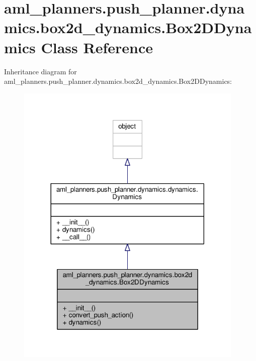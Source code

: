 \hypertarget{classaml__planners_1_1push__planner_1_1dynamics_1_1box2d__dynamics_1_1_box2_d_dynamics}{\section{aml\-\_\-planners.\-push\-\_\-planner.\-dynamics.\-box2d\-\_\-dynamics.\-Box2\-D\-Dynamics Class Reference}
\label{classaml__planners_1_1push__planner_1_1dynamics_1_1box2d__dynamics_1_1_box2_d_dynamics}
}


Inheritance diagram for aml\-\_\-planners.\-push\-\_\-planner.\-dynamics.\-box2d\-\_\-dynamics.\-Box2\-D\-Dynamics\-:
\nopagebreak
\begin{figure}[H]
\begin{center}
\leavevmode
\includegraphics[width=308pt]{classaml__planners_1_1push__planner_1_1dynamics_1_1box2d__dynamics_1_1_box2_d_dynamics__inherit__graph}
\end{center}
\end{figure}


